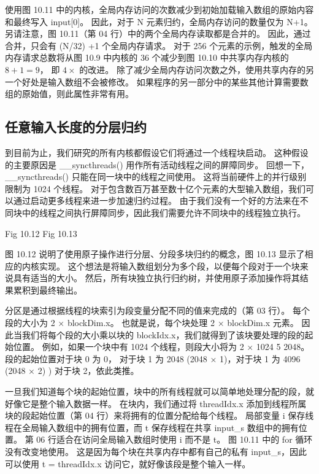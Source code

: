 使用图 10.11 中的内核，全局内存访问的次数减少到初始加载输入数组的原始内容和最终写入 input[0]。 
因此，对于 N 元素归约，全局内存访问的数量仅为 N+1。 另请注意，图 10.11（第 04 行）中的两个全局内存读取都是合并的。 
因此，通过合并，只会有 (N/32) +1 个全局内存请求。 
对于 256 个元素的示例，触发的全局内存请求总数将从图 10.9 中内核的 36 个减少到图 10.10 中共享内存内核的 $8+1 = 9$，
即 $4\times$ 的改进。 除了减少全局内存访问次数之外，使用共享内存的另一个好处是输入数组不会被修改。 
如果程序的另一部分中的某些其他计算需要数组的原始值，则此属性非常有用。

\subsection{任意输入长度的分层归约}
到目前为止，我们研究的所有内核都假设它们将通过一个线程块启动。 
这种假设的主要原因是 \_\_syncthreads() 用作所有活动线程之间的屏障同步。 
回想一下，\_\_syncthreads() 只能在同一块中的线程之间使用。 这将当前硬件上的并行级别限制为 1024 个线程。 
对于包含数百万甚至数十亿个元素的大型输入数组，我们可以通过启动更多线程来进一步加速归约过程。 
由于我们没有一个好的方法来在不同块中的线程之间执行屏障同步，因此我们需要允许不同块中的线程独立执行。

{\color{red} Fig 10.12
}
{\color{red} Fig 10.13}

图 10.12 说明了使用原子操作进行分层、分段多块归约的概念，图 10.13 显示了相应的内核实现。 
这个想法是将输入数组划分为多个段，以便每个段对于一个块来说具有适当的大小。 
然后，所有块独立执行归约树，并使用原子添加操作将其结果累积到最终输出。

分区是通过根据线程的块索引为段变量分配不同的值来完成的（第 03 行）。 每个段的大小为 2 × blockDim.x。 
也就是说，每个块处理 2 × blockDim.x 元素。 
因此当我们将每个段的大小乘以块的 blockIdx.x，我们就得到了该块要处理的段的起始位置。 
例如，如果一个块中有 1024 个线程，则段大小将为 2 × 1024 5 2048。段的起始位置对于块 0 为 0，
对于块 1 为 2048 (2048 × 1)，对于块 1 为 4096 (2048 × 2) ) 对于块 2，依此类推。

一旦我们知道每个块的起始位置，块中的所有线程就可以简单地处理分配的段，就好像它是整个输入数据一样。 
在块内，我们通过将 threadIdx.x 添加到线程所属块的段起始位置（第 04 行）来将拥有的位置分配给每个线程。 
局部变量 i 保存线程在全局输入数组中的拥有位置，而 t 保存线程在共享 input\_s 数组中的拥有位置。 
第 06 行适合在访问全局输入数组时使用 i 而不是 t。 图 10.11 中的 for 循环没有改变地使用。 
这是因为每个块在共享内存中都有自己的私有 input\_s，因此可以使用 t = threadIdx.x 访问它，就好像该段是整个输入一样。


